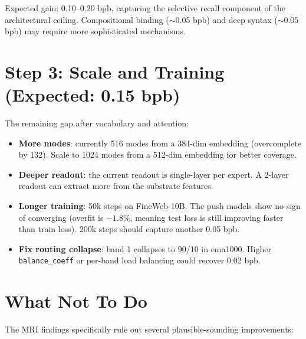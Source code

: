 \documentclass[11pt,a4paper]{report}
\begin{document}
Expected gain: 0.10--0.20 bpb, capturing the selective recall component of the architectural ceiling. Compositional binding ($\sim$0.05 bpb) and deep syntax ($\sim$0.05 bpb) may require more sophisticated mechanisms.

\section{Step 3: Scale and Training (Expected: 0.15 bpb)}

The remaining gap after vocabulary and attention:

\begin{itemize}[nosep]
\item \textbf{More modes}: currently 516 modes from a 384-dim embedding (overcomplete by 132). Scale to 1024 modes from a 512-dim embedding for better coverage.
\item \textbf{Deeper readout}: the current readout is single-layer per expert. A 2-layer readout can extract more from the substrate features.
\item \textbf{Longer training}: 50k steps on FineWeb-10B. The push models show no sign of converging (overfit is $-1.8\%$, meaning test loss is still improving faster than train loss). 200k steps should capture another 0.05 bpb.
\item \textbf{Fix routing collapse}: band 1 collapses to 90/10 in ema1000. Higher \texttt{balance\_coeff} or per-band load balancing could recover 0.02 bpb.
\end{itemize}

\section{What Not To Do}

The MRI findings specifically rule out several plausible-sounding improvements:
\end{document}
